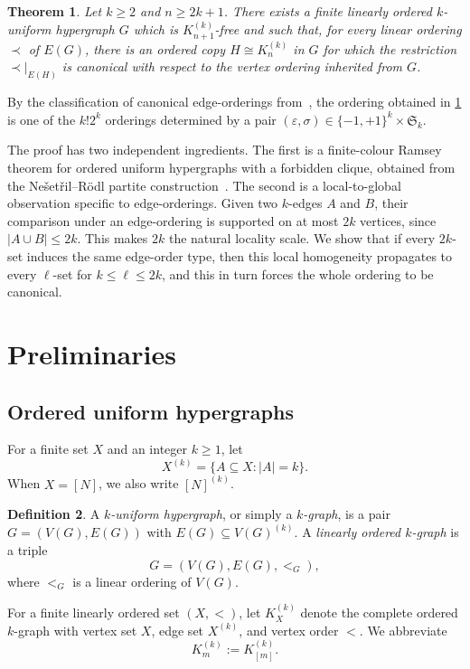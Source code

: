 \documentclass[11pt]{amsart}
\newtheorem{theorem}{Theorem}[section]
\theoremstyle{definition}
\newtheorem{definition}[theorem]{Definition}
\newcommand{\eps}{\varepsilon}
\newcommand{\Sym}{\mathfrak{S}}
\begin{document}
\begin{theorem}\label{thm:main}
Let $k\ge 2$ and $n\ge 2k+1$. There exists a finite linearly ordered $k$-uniform hypergraph $G$ which is $K_{n+1}^{(k)}$-free and such that, for every linear ordering $\prec$ of $E(G)$, there is an ordered copy $H\cong K_n^{(k)}$ in $G$ for which the restriction $\prec|_{E(H)}$ is canonical with respect to the vertex ordering inherited from $G$.
\end{theorem}

By the classification of canonical edge-orderings from~\cite{RRSSS2022}, the ordering obtained in \cref{thm:main} is one of the $k!2^k$ orderings determined by a pair $(\eps,\sigma)\in\{-1,+1\}^k\times\Sym_k$.

The proof has two independent ingredients. The first is a finite-colour Ramsey theorem for ordered uniform hypergraphs with a forbidden clique, obtained from the Ne\v{s}et\v{r}il--R\"odl partite construction~\cite{NR1989}. The second is a local-to-global observation specific to edge-orderings. Given two $k$-edges $A$ and $B$, their comparison under an edge-ordering is supported on at most $2k$ vertices, since $|A\cup B|\le 2k$. This makes $2k$ the natural locality scale. We show that if every $2k$-set induces the same edge-order type, then this local homogeneity propagates to every $\ell$-set for $k\le \ell\le 2k$, and this in turn forces the whole ordering to be canonical.

\section{Preliminaries}

\subsection{Ordered uniform hypergraphs}

For a finite set $X$ and an integer $k\ge 1$, let
\[
X^{(k)}=\{A\subseteq X:|A|=k\}.
\]
When $X=[N]$, we also write $[N]^{(k)}$.

\begin{definition}
A \emph{$k$-uniform hypergraph}, or simply a \emph{$k$-graph}, is a pair $G=(V(G),E(G))$ with $E(G)\subseteq V(G)^{(k)}$. A \emph{linearly ordered $k$-graph} is a triple
\[
G=(V(G),E(G),<_{G}),
\]
where $<_{G}$ is a linear ordering of $V(G)$.
\end{definition}

For a finite linearly ordered set $(X,<)$, let $K_X^{(k)}$ denote the complete ordered $k$-graph with vertex set $X$, edge set $X^{(k)}$, and vertex order $<$. We abbreviate
\[
K_m^{(k)}:=K_{[m]}^{(k)}.
\]
\end{document}
